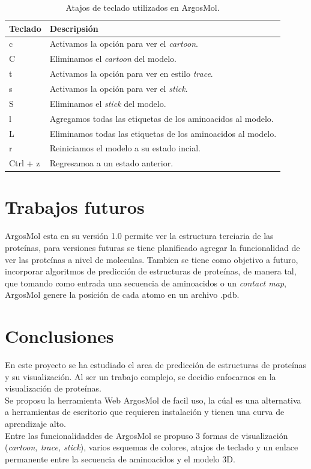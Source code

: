 \documentclass{article}
\begin{document}
\begin{table}[H]
	
	\begin{tabular}{p{2.1cm} p{12.6cm}}
		\textbf{Teclado} & \textbf{Descripsión}   \\
		\hline 
		c & Activamos la opción para ver el \textit{cartoon}. \\
		C & Eliminamos el \textit{cartoon} del modelo. \\
		t & Activamos la opción para ver en estilo \textit{trace}. \\
		s & Activamos la opción para ver el \textit{stick}. \\ 
		S & Eliminamos el \textit{stick} del modelo. \\
		l & Agregamos todas las etiquetas de los aminoacidos al modelo. \\
		L & Eliminamos todas las etiquetas de los aminoacidos al modelo. \\
		r & Reiniciamos el modelo a su estado incial. \\
		Ctrl + z & Regresamoa a un estado anterior. \\
		\hline
	\end{tabular}
	\caption{Atajos de teclado utilizados en ArgosMol.}
	\label{tab:tecalado}
\end{table}	
	
\section{Trabajos futuros}
ArgosMol esta en su versión 1.0 permite ver la estructura terciaria de las proteínas, para versiones futuras se tiene planificado agregar la funcionalidad de ver las proteínas a nivel de moleculas. Tambien se tiene como objetivo a futuro, incorporar algoritmos de predicción de estructuras de proteínas, de manera tal, que tomando como entrada una secuencia de aminoacidos o un \textit{contact map}, ArgosMol genere la posición de cada atomo en un archivo .pdb.

\section{Conclusiones}

En este proyecto se ha estudiado el area de predicción de estructuras de proteínas y su visualización. Al ser un trabajo complejo, se decidio enfocarnos en la visualización de proteínas.\\

Se proposu la herramienta Web ArgosMol de facil uso, la cúal es una alternativa a herramientas de escritorio que requieren instalación y tienen una curva de aprendizaje alto.\\

Entre las funcionalidaddes de ArgosMol se propuso 3 formas de visualización (\textit{cartoon, trace, stick}), varios esquemas de colores, atajos de teclado y un enlace permanente entre la secuencia de aminoacidos y el modelo 3D.
	
	
	
	
	
	
	
	
\end{document}
